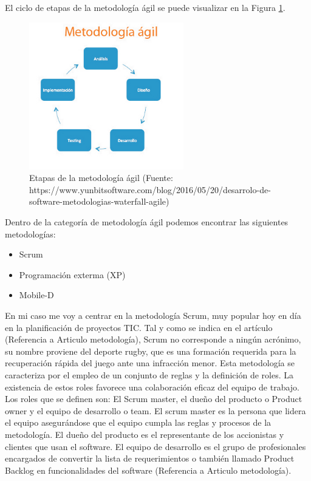 El ciclo de etapas de la metodología ágil se puede visualizar en la Figura \ref{fig:etapas_agil}.

\begin{figure}[h]
    \centering
    \includegraphics[width=0.6\textwidth]{imagenes/03_Planificacion/meto_agil.jpg}
    \caption{Etapas de la metodología ágil (Fuente: https://www.yunbitsoftware.com/blog/2016/05/20/desarrolo-de-software-metodologias-waterfall-agile)}
    \label{fig:etapas_agil}
\end{figure}

Dentro de la categoría de metodología ágil podemos encontrar las siguientes metodologías:

\begin{itemize}
    \item Scrum
    \item Programación exterma (XP)
    \item Mobile-D
\end{itemize}

En mi caso me voy a centrar en la metodología Scrum, muy popular hoy en día en la planificación de proyectos TIC. Tal y como se indica en el artículo (Referencia a Articulo metodología), Scrum no corresponde a ningún acrónimo, su nombre proviene del deporte rugby, que es una formación requerida para la recuperación rápida del juego ante una infracción menor. Esta metodología se caracteriza por el empleo de un conjunto de reglas y la definición de roles. La existencia de estos roles favorece una colaboración eficaz del equipo de trabajo. 
Los roles que se definen son: El Scrum master, el dueño del producto o Product owner y el equipo de desarrollo o team. El scrum master es la persona que lidera el equipo asegurándose que el equipo cumpla las reglas y procesos de la metodología. El dueño del producto es el representante de los accionistas y clientes que usan el software. El equipo de desarrollo es el grupo de profesionales encargados de convertir la lista de requerimientos o también llamado Product Backlog en funcionalidades del software (Referencia a Articulo metodología).

